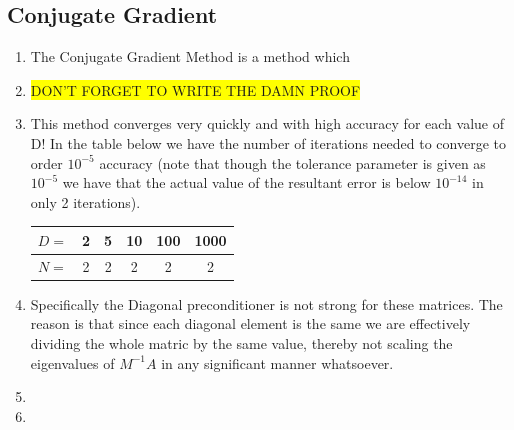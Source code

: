 \documentclass{article}
\begin{document}
\subsection{Conjugate Gradient}

    \begin{enumerate}

        \item The Conjugate Gradient Method is a method which 
    
        \item \colorbox{yellow}{DON'T FORGET TO WRITE THE DAMN PROOF}

        \item This method converges very quickly and with high accuracy for each value of D! In the table below we have the number of iterations needed to converge to order $10^{-5}$ accuracy (note that though the tolerance parameter is given as $10^{-5}$ we have that the actual value of the resultant error is below $10^{-14}$ in only 2 iterations). 

            \begin{center}

                \begin{tabular}{|c|c|c|c|c|c|}
                \hline
                $D = $ & 2 & 5 & 10 & 100 & 1000 \\
                \hline
                $N = $ & 2 & 2 & 2 & 2 & 2 \\
                \hline
                \end{tabular}

            \end{center}

        \item Specifically the Diagonal preconditioner is not strong for these matrices. The reason is that since each diagonal element is the same we are effectively dividing the whole matric by the same value, thereby not scaling the eigenvalues of $M^{-1}A$ in any significant manner whatsoever. 

        \item

        \item

    \end{enumerate}
\end{document}

